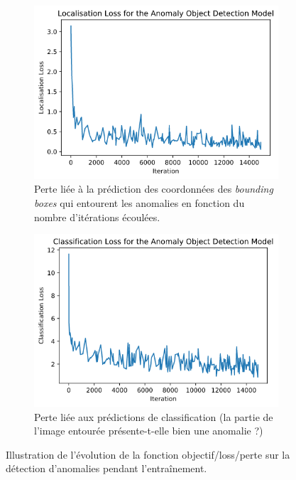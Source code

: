 \documentclass[french]{article}
\theoremstyle{mytheoremstyle}
\theoremstyle{mytheoremstyle}
\theoremstyle{myproblemstyle}
\begin{document}
    \begin{figure}[H]
    \centering
    \begin{subfigure}[t]{0.49\textwidth}
            \centering
            \includegraphics[width=1\textwidth]{images/od_loc_loss.png}
            \caption{Perte liée à la prédiction des coordonnées des \emph{bounding boxes} qui entourent les anomalies en fonction du nombre d'itérations écoulées.}
    \end{subfigure}%
    \hfill
    \begin{subfigure}[t]{0.49\textwidth}
            \centering
            \includegraphics[width=1\textwidth]{images/od_cla_loss.png}
           	\caption{Perte liée aux prédictions de classification (la partie de l'image entourée présente-t-elle bien une anomalie ?)}
    \end{subfigure}
	\caption{Illustration de l'évolution de la fonction objectif/loss/perte sur la détection d'anomalies pendant l'entraînement.}
    \end{figure}
    
\end{document}

